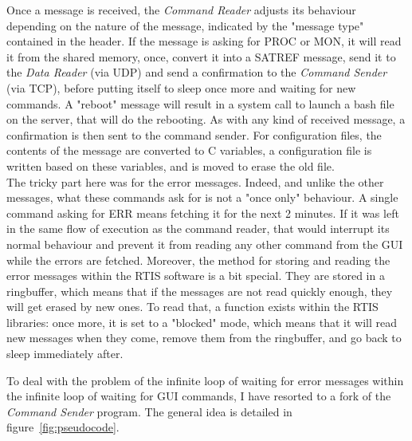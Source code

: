 \documentclass{themeensg}
\begin{document}
Once a message is received, the \textit{Command Reader} adjusts its behaviour depending on the nature of the message, indicated by the "message type" contained in the header. If the message is asking for PROC or MON, it will read it from the shared memory, once, convert it into a SATREF message, send it to the \textit{Data Reader} (via UDP) and send a confirmation to the \textit{Command Sender} (via TCP), before putting itself to sleep once more and waiting for new commands.
A "reboot" message will result in a system call to launch a bash file on the server, that will do the rebooting. As with any kind of received message, a confirmation is then sent to the command sender. 
For configuration files, the contents of the message are converted to C variables, a configuration file is written based on these variables, and is moved to erase the old file.\\

The tricky part here was for the error messages. Indeed, and unlike the other messages, what these commands ask for is not a "once only" behaviour. A single command asking for ERR means fetching it for the next 2 minutes. If it was left in the same flow of execution as the command reader, that would interrupt its normal behaviour and prevent it from reading any other command from the GUI while the errors are fetched.
Moreover, the method for storing and reading the error messages within the RTIS software is a bit special. They are stored in a ringbuffer, which means that if the messages are not read quickly enough, they will get erased by new ones. To read that, a function exists within the RTIS libraries: once more, it is set to a "blocked" mode, which means that it will read new messages when they come, remove them from the ringbuffer, and go back to sleep immediately after.

To deal with the problem of the infinite loop of waiting for error messages within the infinite loop of waiting for GUI commands, I have resorted to a fork of the \textit{Command Sender} program. The general idea is detailed in figure~\ref{fig:pseudocode}.\\
\end{document}
